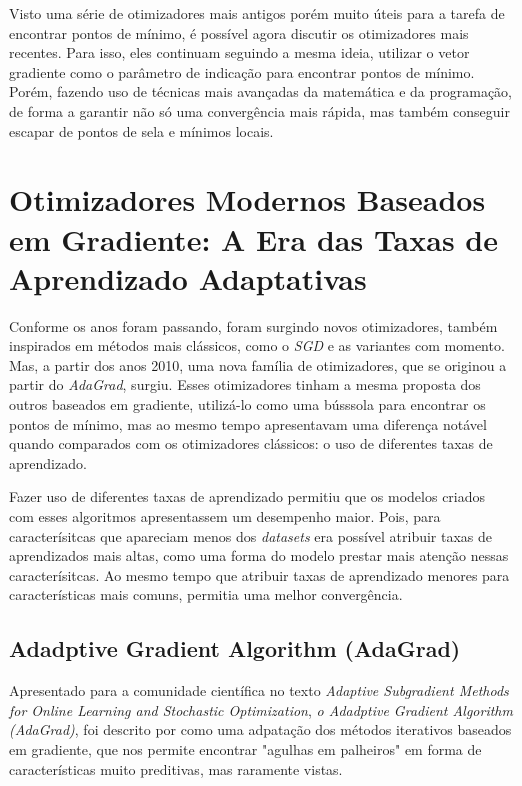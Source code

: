 Visto uma série de otimizadores mais antigos porém muito úteis para a tarefa de encontrar pontos de mínimo, é possível agora discutir os otimizadores mais recentes. Para isso, eles continuam seguindo a mesma ideia, utilizar o vetor gradiente como o parâmetro de indicação para encontrar pontos de mínimo. Porém, fazendo uso de técnicas mais avançadas da matemática e da programação, de forma a garantir não só uma convergência mais rápida, mas também conseguir escapar de pontos de sela e mínimos locais.

\section{Otimizadores Modernos Baseados em Gradiente: A Era das Taxas de Aprendizado Adaptativas}

Conforme os anos foram passando, foram surgindo novos otimizadores, também inspirados em métodos mais clássicos, como o \textit{SGD} e as variantes com momento. Mas, a partir dos anos 2010, uma nova família de otimizadores, que se originou a partir do \textit{AdaGrad}, surgiu. Esses otimizadores tinham a mesma proposta dos outros baseados em gradiente, utilizá-lo como uma bússsola para encontrar os pontos de mínimo, mas ao mesmo tempo apresentavam uma diferença notável quando comparados com os otimizadores clássicos: o uso de diferentes taxas de aprendizado.

Fazer uso de diferentes taxas de aprendizado permitiu que os modelos criados com esses algoritmos apresentassem um desempenho maior. Pois, para caracterísitcas que apareciam menos dos \textit{datasets} era possível atribuir taxas de aprendizados mais altas, como uma forma do modelo prestar mais atenção nessas caracterísitcas. Ao mesmo tempo que atribuir taxas de aprendizado menores para características mais comuns, permitia uma melhor convergência.

\subsection{Adadptive Gradient Algorithm (AdaGrad)}

Apresentado para a comunidade científica no texto \textit{Adaptive Subgradient Methods for Online Learning and Stochastic Optimization}, \textit{o Adadptive Gradient Algorithm (AdaGrad)}, foi descrito por \textcite{AdaGradMethod} como uma adpatação dos métodos iterativos baseados em gradiente, que nos permite encontrar "agulhas em palheiros" em forma de características muito preditivas, mas raramente vistas.

